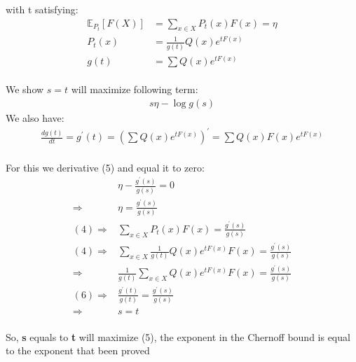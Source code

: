 \documentclass[
  course = {{EE623 Information Theory}},
  quartile = {{4}},
  assignment = 5,
  name = {{Mohammad Mahdi Rahimi}},
  studentnumber = {{20208244}},
  email = {{mahi@kaist.ac.kr}},
  firstexercise = 1
]{aga-homework}
\begin{document}
with t satisfying:
\begin{equation} \label{eq4}
\begin{split}
\mathbb{E}_{P_t} [F(X)] & = \sum_{x \in X} P_t(x)F(x) = \eta \\
P_t(x) & = \frac{1}{g(t)}Q(x)e^{tF(x)} \\
g(t) & = \sum{Q(x)e^{tF(x)}}
\end{split}
\end{equation}\\
We show $s = t$ will maximize following term:
\begin{equation} \label{eq5}
\begin{split}
s\eta - \log{g(s)}
\end{split}
\end{equation}
We also have:
\begin{equation} \label{eq6}
\begin{split}
\frac{dg(t)}{dt} = 
g^{\prime}(t) = (\sum{Q(x)e^{tF(x)}})^{\prime} = \sum{Q(x)F(x)e^{tF(x)}}
\end{split}
\end{equation}\\
For this we derivative (5) and equal it to zero:
\begin{equation} \label{eq7}
\begin{split}
& \eta - \frac{g^{\prime}(s)}{g(s)} = 0 \\
\Rightarrow & \eta = \frac{g^{\prime}(s)}{g(s)} \\
(4) \Rightarrow & \sum_{x \in X} P_t(x)F(x) = \frac{g^{\prime}(s)}{g(s)} \\
(4) \Rightarrow & \sum_{x \in X} \frac{1}{g(t)}Q(x)e^{tF(x)}F(x) = \frac{g^{\prime}(s)}{g(s)} \\
\Rightarrow & \frac{1}{g(t)}\sum_{x \in X} Q(x)e^{tF(x)}F(x) = \frac{g^{\prime}(s)}{g(s)} \\
(6) \Rightarrow & \frac{g^{\prime}(t)}{g(t)} = \frac{g^{\prime}(s)}{g(s)}\\
\Rightarrow & s = t
\end{split}
\end{equation}\\
So, \textbf{s} equals to \textbf{t} will maximize (5), the exponent in the Chernoff bound is equal to the exponent that been proved
\end{document}
